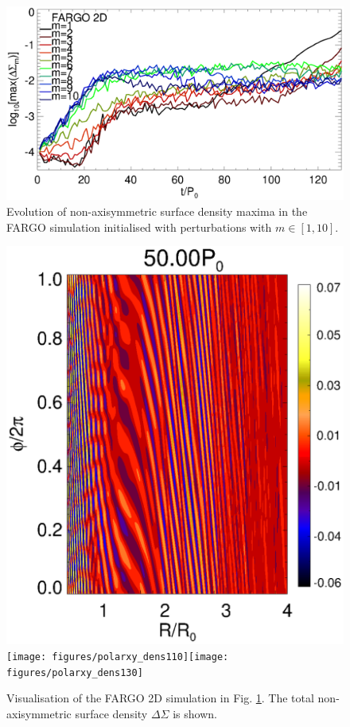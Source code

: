 \begin{figure}
  \includegraphics[width=\linewidth]{figures/nonaxi_evol_DZ_fargo}
  \caption{Evolution of non-axisymmetric surface density maxima 
    in the FARGO simulation initialised with perturbations
    with $m\in[1,10]$.\label{fargo_modeamp}} 
\end{figure}

\begin{figure}
  \includegraphics[scale=0.27]{figures/polarxy_dens050}\texttt{[image: figures/polarxy\_dens110]}\texttt{[image: figures/polarxy\_dens130]} 
  \caption{Visualisation of the FARGO 2D simulation in
    Fig. \ref{fargo_modeamp}. The total  
    non-axisymmetric surface density
    $\Delta\Sigma$ is shown. \label{fargo_2d}} 
\end{figure}

